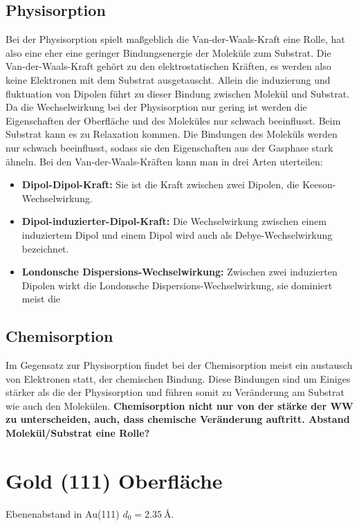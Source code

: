         \subsection{Physisorption}
            Bei der Physisorption spielt maßgeblich die Van-der-Waals-Kraft eine Rolle, hat also eine eher eine geringer Bindungsenergie der Moleküle zum Substrat.
            Die Van-der-Waals-Kraft gehört zu den elektrostatischen Kräften, es werden also keine Elektronen mit dem Substrat ausgetauscht.
            Allein die induzierung und fluktuation von Dipolen führt zu dieser Bindung zwischen Molekül und Substrat.
            Da die Wechselwirkung bei der Physisorption nur gering ist werden die Eigenschaften der Oberfläche und des Moleküles nur schwach beeinflusst.
            Beim Substrat kann es zu Relaxation kommen.
            Die Bindungen des Moleküls werden nur schwach beeinflusst, sodass sie den Eigenschaften aus der Gasphase stark ähneln.
            Bei den Van-der-Waals-Kräften kann man in drei Arten uterteilen:
            \begin{itemize}
                \item \textbf{Dipol-Dipol-Kraft:} Sie ist die Kraft zwischen zwei Dipolen, die Keeson-Wechselwirkung.
                \item \textbf{Dipol-induzierter-Dipol-Kraft:} Die Wechselwirkung zwischen einem induziertem Dipol und einem Dipol wird auch als Debye-Wechselwirkung bezeichnet.
                \item \textbf{Londonsche Dispersions-Wechselwirkung:} Zwischen zwei induzierten Dipolen wirkt die Londonsche Dispersions-Wechselwirkung, sie dominiert meist die 
            \end{itemize}
        
        
        \subsection{Chemisorption}
            Im Gegensatz zur Physisorption findet bei der Chemisorption meist ein austausch von Elektronen statt, der chemischen Bindung.
            Diese Bindungen sind um Einiges stärker als die der Physisorption und führen somit zu Veränderung am Substrat wie auch den Molekülen.
            \textbf{Chemisorption nicht nur von der stärke der WW zu unterscheiden, auch, dass chemische Veränderung auftritt.
            Abstand Molekül/Substrat eine Rolle?}
            
    \section{Gold (111) Oberfläche}
        \textbf{\cite{5A_1}}
        Ebenenabstand in Au(111) $d_0 = \SI{2.35}{\angstrom}$.

